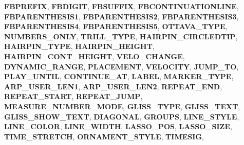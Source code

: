 \begin{DoxyCompactItemize}
{\bfseries F\+B\+P\+R\+E\+F\+IX}, 
{\bfseries F\+B\+D\+I\+G\+IT}, 
{\bfseries F\+B\+S\+U\+F\+F\+IX}, 
{\bfseries F\+B\+C\+O\+N\+T\+I\+N\+U\+A\+T\+I\+O\+N\+L\+I\+NE}, 
\newline
{\bfseries F\+B\+P\+A\+R\+E\+N\+T\+H\+E\+S\+I\+S1}, 
{\bfseries F\+B\+P\+A\+R\+E\+N\+T\+H\+E\+S\+I\+S2}, 
{\bfseries F\+B\+P\+A\+R\+E\+N\+T\+H\+E\+S\+I\+S3}, 
{\bfseries F\+B\+P\+A\+R\+E\+N\+T\+H\+E\+S\+I\+S4}, 
\newline
{\bfseries F\+B\+P\+A\+R\+E\+N\+T\+H\+E\+S\+I\+S5}, 
{\bfseries O\+T\+T\+A\+V\+A\+\_\+\+T\+Y\+PE}, 
{\bfseries N\+U\+M\+B\+E\+R\+S\+\_\+\+O\+N\+LY}, 
{\bfseries T\+R\+I\+L\+L\+\_\+\+T\+Y\+PE}, 
\newline
{\bfseries H\+A\+I\+R\+P\+I\+N\+\_\+\+C\+I\+R\+C\+L\+E\+D\+T\+IP}, 
{\bfseries H\+A\+I\+R\+P\+I\+N\+\_\+\+T\+Y\+PE}, 
{\bfseries H\+A\+I\+R\+P\+I\+N\+\_\+\+H\+E\+I\+G\+HT}, 
{\bfseries H\+A\+I\+R\+P\+I\+N\+\_\+\+C\+O\+N\+T\+\_\+\+H\+E\+I\+G\+HT}, 
\newline
{\bfseries V\+E\+L\+O\+\_\+\+C\+H\+A\+N\+GE}, 
{\bfseries D\+Y\+N\+A\+M\+I\+C\+\_\+\+R\+A\+N\+GE}, 
{\bfseries P\+L\+A\+C\+E\+M\+E\+NT}, 
{\bfseries V\+E\+L\+O\+C\+I\+TY}, 
\newline
{\bfseries J\+U\+M\+P\+\_\+\+TO}, 
{\bfseries P\+L\+A\+Y\+\_\+\+U\+N\+T\+IL}, 
{\bfseries C\+O\+N\+T\+I\+N\+U\+E\+\_\+\+AT}, 
{\bfseries L\+A\+B\+EL}, 
\newline
{\bfseries M\+A\+R\+K\+E\+R\+\_\+\+T\+Y\+PE}, 
{\bfseries A\+R\+P\+\_\+\+U\+S\+E\+R\+\_\+\+L\+E\+N1}, 
{\bfseries A\+R\+P\+\_\+\+U\+S\+E\+R\+\_\+\+L\+E\+N2}, 
{\bfseries R\+E\+P\+E\+A\+T\+\_\+\+E\+ND}, 
\newline
{\bfseries R\+E\+P\+E\+A\+T\+\_\+\+S\+T\+A\+RT}, 
{\bfseries R\+E\+P\+E\+A\+T\+\_\+\+J\+U\+MP}, 
{\bfseries M\+E\+A\+S\+U\+R\+E\+\_\+\+N\+U\+M\+B\+E\+R\+\_\+\+M\+O\+DE}, 
{\bfseries G\+L\+I\+S\+S\+\_\+\+T\+Y\+PE}, 
\newline
{\bfseries G\+L\+I\+S\+S\+\_\+\+T\+E\+XT}, 
{\bfseries G\+L\+I\+S\+S\+\_\+\+S\+H\+O\+W\+\_\+\+T\+E\+XT}, 
{\bfseries D\+I\+A\+G\+O\+N\+AL}, 
{\bfseries G\+R\+O\+U\+PS}, 
\newline
{\bfseries L\+I\+N\+E\+\_\+\+S\+T\+Y\+LE}, 
{\bfseries L\+I\+N\+E\+\_\+\+C\+O\+L\+OR}, 
{\bfseries L\+I\+N\+E\+\_\+\+W\+I\+D\+TH}, 
{\bfseries L\+A\+S\+S\+O\+\_\+\+P\+OS}, 
\newline
{\bfseries L\+A\+S\+S\+O\+\_\+\+S\+I\+ZE}, 
{\bfseries T\+I\+M\+E\+\_\+\+S\+T\+R\+E\+T\+CH}, 
{\bfseries O\+R\+N\+A\+M\+E\+N\+T\+\_\+\+S\+T\+Y\+LE}, 
{\bfseries T\+I\+M\+E\+S\+IG}, 
\newline

\end{DoxyCompactItemize}
